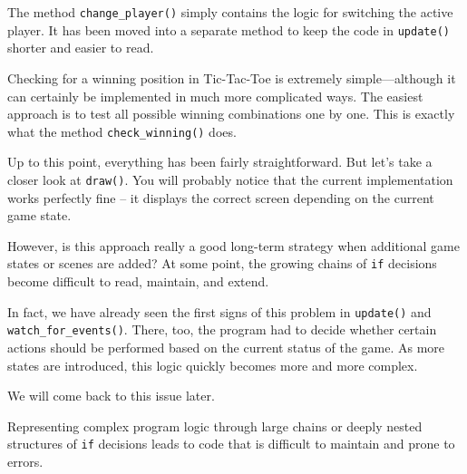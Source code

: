 The method \texttt{change\_player()} simply contains the logic for switching the active player. It has been moved into a separate method to keep the code in \texttt{update()} shorter and easier to read.


Checking for a winning position in Tic-Tac-Toe is extremely simple—although it can certainly be implemented in much more complicated ways. The easiest approach is to test all possible winning combinations one by one. This is exactly what the method \texttt{check\_winning()} does.


Up to this point, everything has been fairly straightforward. But let's take a closer look at \texttt{draw()}. You will probably notice that the current implementation works perfectly fine -- it displays the correct screen depending on the current game state.

However, is this approach really a good long-term strategy when additional game states or scenes are added? At some point, the growing chains of \texttt{if} decisions become difficult to read, maintain, and extend.

In fact, we have already seen the first signs of this problem in \texttt{update()} and \texttt{watch\_for\-\_events()}. There, too, the program had to decide whether certain actions should be performed based on the current status of the game. As more states are introduced, this logic quickly becomes more and more complex.


We will come back to this issue later.

\begin{warningbox}
	
	Representing complex program logic through large chains or deeply nested structures of \texttt{if} decisions leads to code that is difficult to maintain and prone to errors.
	
\end{warningbox}

